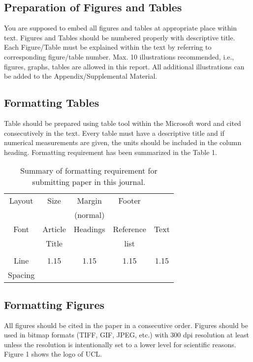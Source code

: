 \documentclass[11pt,twocolumn]{article}
\begin{document}
\subsection{Preparation of Figures and Tables}
You are supposed to embed all figures and tables at appropriate place within text. Figures and Tables should be numbered properly with descriptive title. Each Figure/Table must be explained within the text by referring to corresponding figure/table number. Max. 10 illustrations recommended, i.e., figures, graphs, tables are allowed in this report. All additional illustrations can be added to the Appendix/Supplemental Material.

\subsection{Formatting Tables}
Table should be prepared using table tool within the Microsoft word and cited consecutively in the text. Every table must have a descriptive title and if numerical measurements are given, the units should be included in the column heading. Formatting requirement has been summarized in the Table 1.


\begin{table}
\caption{Summary of formatting requirement for submitting paper in this journal.}

\begin{tabular}{|c|c|c|c|c|} \hline
Layout	& Size&	Margin  &	Footer &	 \\ 
 	&  &	(normal) &	 &	 \\  \hline
Font &	Article 	&Headings	&Reference	&Text \\ 
 &	Title	& 	& list	& \\ \hline
& & & & \\				\hline
Line  &	1.15	&1.15&	1.15	&1.15 \\ \hline
 Spacing &		&  &		&  \\ \hline
\end{tabular}
\end{table}


\subsection{Formatting Figures}
All figures should be cited in the paper in a consecutive order. Figures should be used in bitmap formats (TIFF, GIF, JPEG, etc.) with 300 dpi resolution at least unless the resolution is intentionally set to a lower level for scientific reasons. Figure 1 shows the logo of UCL.
\end{document}
